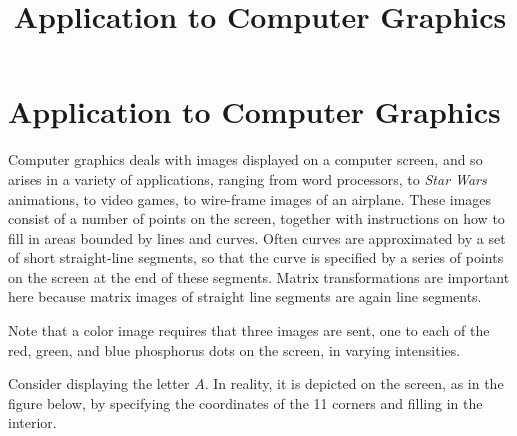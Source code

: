 \documentclass{ximera}
\title{Application to Computer Graphics} \license{CC BY-NC-SA 4.0}
\begin{document}
\begin{abstract}
\end{abstract}
\maketitle

\section*{Application to Computer Graphics}
Computer graphics deals with images
displayed on a computer screen, and so arises in a variety of
applications, ranging from word processors, to \textit{Star Wars}
animations, to video games, to wire-frame images of an airplane.  These
images consist of a number of points on the screen, together with
instructions on how to fill in areas bounded by lines and curves. Often
curves are approximated by a set of short straight-line segments, so
that the curve is specified by a series of points on the screen at the
end of these segments. Matrix transformations are important here because
 matrix images of straight line segments are again line segments.
 
 Note that a color image requires that three images are sent, one to
each of the red, green, and blue phosphorus dots on the screen, in
varying intensities.

Consider displaying the letter $A$. In reality, it is depicted on the screen, as in the figure below, by specifying the coordinates of the 11 corners and filling in the interior.
\end{document}
